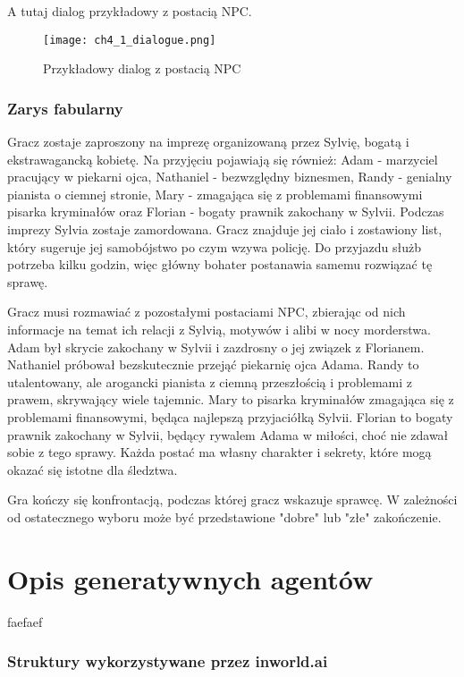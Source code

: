 A tutaj dialog przykładowy z postacią NPC.

\begin{figure}[h!]
    \centering
    \texttt{[image: ch4\_1\_dialogue.png]}
    \caption{Przykładowy dialog z postacią NPC}
    \label{fig:ch4_1_dialogue}
\end{figure}

\subsubsection*{Zarys fabularny}

Gracz zostaje zaproszony na imprezę organizowaną przez Sylvię, bogatą i ekstrawagancką kobietę. Na
przyjęciu pojawiają się również: Adam - marzyciel pracujący w piekarni ojca, Nathaniel -
bezwzględny biznesmen, Randy - genialny pianista o ciemnej stronie, Mary - zmagająca się z
problemami finansowymi pisarka kryminałów oraz Florian - bogaty prawnik zakochany w Sylvii.
Podczas imprezy Sylvia zostaje zamordowana. Gracz znajduje jej ciało i zostawiony list, który
sugeruje jej samobójstwo po czym wzywa policję. Do przyjazdu służb potrzeba kilku godzin, więc
główny bohater postanawia samemu rozwiązać tę sprawę.

Gracz musi rozmawiać z pozostałymi postaciami NPC, zbierając od nich informacje na temat ich
relacji z Sylvią, motywów i alibi w nocy morderstwa. Adam był skrycie zakochany w Sylvii i
zazdrosny o jej związek z Florianem. Nathaniel próbował bezskutecznie przejąć piekarnię ojca Adama.
Randy to utalentowany, ale arogancki pianista z ciemną przeszłością i problemami z prawem,
skrywający wiele tajemnic. Mary to pisarka kryminałów zmagająca się z problemami finansowymi,
będąca najlepszą przyjaciółką Sylvii. Florian to bogaty prawnik zakochany w Sylvii, będący rywalem
Adama w miłości, choć nie zdawał sobie z tego sprawy. Każda postać ma własny charakter i sekrety,
które mogą okazać się istotne dla śledztwa.

Gra kończy się konfrontacją, podczas której gracz wskazuje sprawcę.
W zależności od ostatecznego wyboru może być przedstawione "dobre" lub "złe" zakończenie.

\section{Opis generatywnych agentów}\label{section:ch4_2}

faefaef

\subsubsection*{Struktury wykorzystywane przez inworld.ai}

